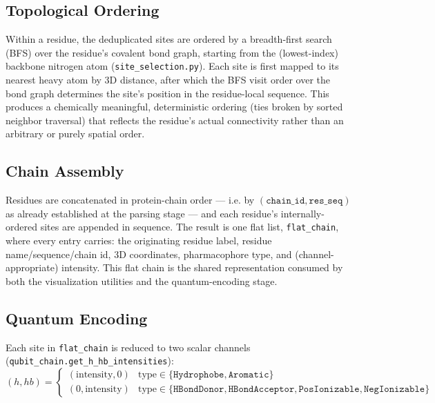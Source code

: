 \documentclass[11pt,a4paper]{article}
\begin{document}
\subsection{Topological Ordering}
\label{sec:topological-order}

Within a residue, the deduplicated sites are ordered by a breadth-first search (BFS) over the residue's covalent bond graph, starting from the (lowest-index) backbone nitrogen atom (\texttt{site\_selection.py}). Each site is first mapped to its nearest heavy atom by 3D distance, after which the BFS visit order over the bond graph determines the site's position in the residue-local sequence. This produces a chemically meaningful, deterministic ordering (ties broken by sorted neighbor traversal) that reflects the residue's actual connectivity rather than an arbitrary or purely spatial order.

\subsection{Chain Assembly}
\label{sec:chain-assembly}

Residues are concatenated in protein-chain order — i.e. by $(\texttt{chain\_id}, \texttt{res\_seq})$ as already established at the parsing stage — and each residue's internally-ordered sites are appended in sequence. The result is one flat list, \texttt{flat\_chain}, where every entry carries: the originating residue label, residue name/sequence/chain id, 3D coordinates, pharmacophore type, and (channel-appropriate) intensity. This flat chain is the shared representation consumed by both the visualization utilities and the quantum-encoding stage.

\subsection{Quantum Encoding}
\label{sec:quantum-encoding}

Each site in \texttt{flat\_chain} is reduced to two scalar channels (\texttt{qubit\_chain.get\_h\_hb\_intensities}):
\[
(h, hb) = \begin{cases}
(\text{intensity}, 0) & \text{type} \in \{\texttt{Hydrophobe}, \texttt{Aromatic}\} \\
(0, \text{intensity}) & \text{type} \in \{\texttt{HBondDonor}, \texttt{HBondAcceptor}, \texttt{PosIonizable}, \texttt{NegIonizable}\}
\end{cases}
\]
\end{document}

